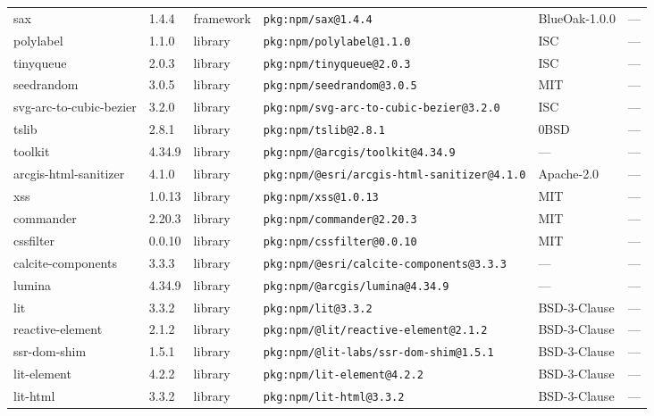 \documentclass[11pt,a4paper]{article}
\begin{document}
\begin{longtable}{|p{4cm}|p{2cm}|p{1.6cm}|p{5cm}|p{1.5cm}|p{3.5cm}|}
\raggedright sax & 1.4.4 & framework & \small\texttt{pkg:npm/sax@1.4.4} & BlueOak-1.0.0 & \small — \\
\raggedright polylabel & 1.1.0 & library & \small\texttt{pkg:npm/polylabel@1.1.0} & ISC & \small — \\
\raggedright tinyqueue & 2.0.3 & library & \small\texttt{pkg:npm/tinyqueue@2.0.3} & ISC & \small — \\
\raggedright seedrandom & 3.0.5 & library & \small\texttt{pkg:npm/seedrandom@3.0.5} & MIT & \small — \\
\raggedright svg-arc-to-cubic-bezier & 3.2.0 & library & \small\texttt{pkg:npm/svg-arc-to-cubic-bezier@3.2.0} & ISC & \small — \\
\raggedright tslib & 2.8.1 & library & \small\texttt{pkg:npm/tslib@2.8.1} & 0BSD & \small — \\
\raggedright toolkit & 4.34.9 & library & \small\texttt{pkg:npm/@arcgis/toolkit@4.34.9} & — & \small — \\
\raggedright arcgis-html-sanitizer & 4.1.0 & library & \small\texttt{pkg:npm/@esri/arcgis-html-sanitizer@4.1.0} & Apache-2.0 & \small — \\
\raggedright xss & 1.0.13 & library & \small\texttt{pkg:npm/xss@1.0.13} & MIT & \small — \\
\raggedright commander & 2.20.3 & library & \small\texttt{pkg:npm/commander@2.20.3} & MIT & \small — \\
\raggedright cssfilter & 0.0.10 & library & \small\texttt{pkg:npm/cssfilter@0.0.10} & MIT & \small — \\
\raggedright calcite-components & 3.3.3 & library & \small\texttt{pkg:npm/@esri/calcite-components@3.3.3} & — & \small — \\
\raggedright lumina & 4.34.9 & library & \small\texttt{pkg:npm/@arcgis/lumina@4.34.9} & — & \small — \\
\raggedright lit & 3.3.2 & library & \small\texttt{pkg:npm/lit@3.3.2} & BSD-3-Clause & \small — \\
\raggedright reactive-element & 2.1.2 & library & \small\texttt{pkg:npm/@lit/reactive-element@2.1.2} & BSD-3-Clause & \small — \\
\raggedright ssr-dom-shim & 1.5.1 & library & \small\texttt{pkg:npm/@lit-labs/ssr-dom-shim@1.5.1} & BSD-3-Clause & \small — \\
\raggedright lit-element & 4.2.2 & library & \small\texttt{pkg:npm/lit-element@4.2.2} & BSD-3-Clause & \small — \\
\raggedright lit-html & 3.3.2 & library & \small\texttt{pkg:npm/lit-html@3.3.2} & BSD-3-Clause & \small — \\

\end{longtable}
\end{document}
